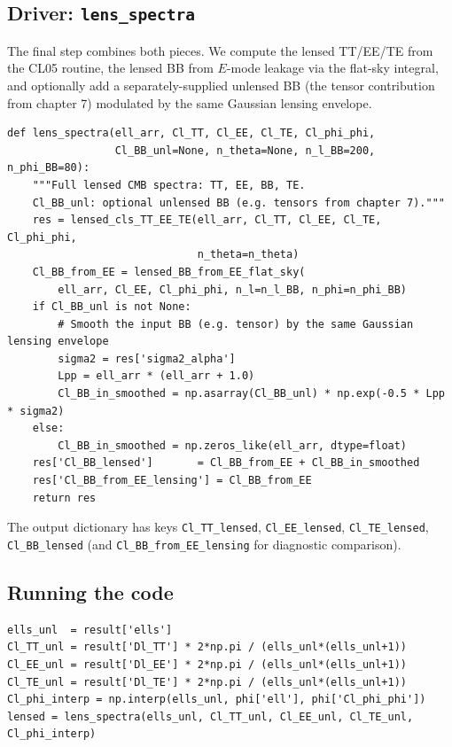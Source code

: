 \subsection{Driver: \texttt{lens\_spectra}}

The final step combines both pieces. We compute the lensed TT/EE/TE from the CL05 routine, the lensed BB from $E$-mode leakage via the flat-sky integral, and optionally add a separately-supplied unlensed BB (the tensor contribution from chapter 7) modulated by the same Gaussian lensing envelope.

\begin{codebox}
\begin{lstlisting}[style=python]
def lens_spectra(ell_arr, Cl_TT, Cl_EE, Cl_TE, Cl_phi_phi,
                 Cl_BB_unl=None, n_theta=None, n_l_BB=200, n_phi_BB=80):
    """Full lensed CMB spectra: TT, EE, BB, TE.
    Cl_BB_unl: optional unlensed BB (e.g. tensors from chapter 7)."""
    res = lensed_cls_TT_EE_TE(ell_arr, Cl_TT, Cl_EE, Cl_TE, Cl_phi_phi,
                              n_theta=n_theta)
    Cl_BB_from_EE = lensed_BB_from_EE_flat_sky(
        ell_arr, Cl_EE, Cl_phi_phi, n_l=n_l_BB, n_phi=n_phi_BB)
    if Cl_BB_unl is not None:
        # Smooth the input BB (e.g. tensor) by the same Gaussian lensing envelope
        sigma2 = res['sigma2_alpha']
        Lpp = ell_arr * (ell_arr + 1.0)
        Cl_BB_in_smoothed = np.asarray(Cl_BB_unl) * np.exp(-0.5 * Lpp * sigma2)
    else:
        Cl_BB_in_smoothed = np.zeros_like(ell_arr, dtype=float)
    res['Cl_BB_lensed']       = Cl_BB_from_EE + Cl_BB_in_smoothed
    res['Cl_BB_from_EE_lensing'] = Cl_BB_from_EE
    return res
\end{lstlisting}
\end{codebox}

The output dictionary has keys \texttt{Cl\_TT\_lensed}, \texttt{Cl\_EE\_lensed}, \texttt{Cl\_TE\_lensed}, \texttt{Cl\_BB\_lensed} (and \texttt{Cl\_BB\_from\_EE\_lensing} for diagnostic comparison).

\subsection{Running the code}

\begin{codebox}
\begin{lstlisting}[style=python]
ells_unl  = result['ells']
Cl_TT_unl = result['Dl_TT'] * 2*np.pi / (ells_unl*(ells_unl+1))
Cl_EE_unl = result['Dl_EE'] * 2*np.pi / (ells_unl*(ells_unl+1))
Cl_TE_unl = result['Dl_TE'] * 2*np.pi / (ells_unl*(ells_unl+1))
Cl_phi_interp = np.interp(ells_unl, phi['ell'], phi['Cl_phi_phi'])
lensed = lens_spectra(ells_unl, Cl_TT_unl, Cl_EE_unl, Cl_TE_unl, Cl_phi_interp)
\end{lstlisting}
\end{codebox}

